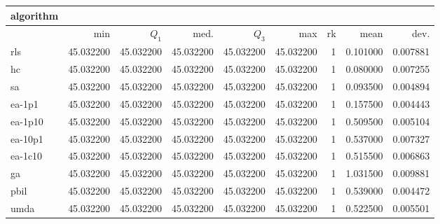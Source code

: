 \begin{center}
\begin{tabular}{@{}l*{5}{>{{}}N{2}{2}}>{{}}N{2}{0}N{1}{3}N{1}{3}@{}}
\toprule
{algorithm} &  &  \\
\midrule
& {min} & {$Q_1$} & {med.} & {$Q_3$} & {max} & {rk} & {mean} & {dev.} \\
\midrule
rls & {\color{blue}} 45.032200 & {\color{blue}} 45.032200 & {\color{blue}} 45.032200 & {\color{blue}} 45.032200 & {\color{blue}} 45.032200 & 1 & 0.101000 & 0.007881 \\
 hc & {\color{blue}} 45.032200 & {\color{blue}} 45.032200 & {\color{blue}} 45.032200 & {\color{blue}} 45.032200 & {\color{blue}} 45.032200 & 1 & 0.080000 & 0.007255 \\
 sa & {\color{blue}} 45.032200 & {\color{blue}} 45.032200 & {\color{blue}} 45.032200 & {\color{blue}} 45.032200 & {\color{blue}} 45.032200 & 1 & 0.093500 & 0.004894 \\
 ea-1p1 & {\color{blue}} 45.032200 & {\color{blue}} 45.032200 & {\color{blue}} 45.032200 & {\color{blue}} 45.032200 & {\color{blue}} 45.032200 & 1 & 0.157500 & 0.004443 \\
 ea-1p10 & {\color{blue}} 45.032200 & {\color{blue}} 45.032200 & {\color{blue}} 45.032200 & {\color{blue}} 45.032200 & {\color{blue}} 45.032200 & 1 & 0.509500 & 0.005104 \\
 ea-10p1 & {\color{blue}} 45.032200 & {\color{blue}} 45.032200 & {\color{blue}} 45.032200 & {\color{blue}} 45.032200 & {\color{blue}} 45.032200 & 1 & 0.537000 & 0.007327 \\
 ea-1c10 & {\color{blue}} 45.032200 & {\color{blue}} 45.032200 & {\color{blue}} 45.032200 & {\color{blue}} 45.032200 & {\color{blue}} 45.032200 & 1 & 0.515500 & 0.006863 \\
 ga & {\color{blue}} 45.032200 & {\color{blue}} 45.032200 & {\color{blue}} 45.032200 & {\color{blue}} 45.032200 & {\color{blue}} 45.032200 & 1 & 1.031500 & 0.009881 \\
 pbil & {\color{blue}} 45.032200 & {\color{blue}} 45.032200 & {\color{blue}} 45.032200 & {\color{blue}} 45.032200 & {\color{blue}} 45.032200 & 1 & 0.539000 & 0.004472 \\
 umda & {\color{blue}} 45.032200 & {\color{blue}} 45.032200 & {\color{blue}} 45.032200 & {\color{blue}} 45.032200 & {\color{blue}} 45.032200 & 1 & 0.522500 & 0.005501 \\
 \bottomrule
\end{tabular}
\end{center}

